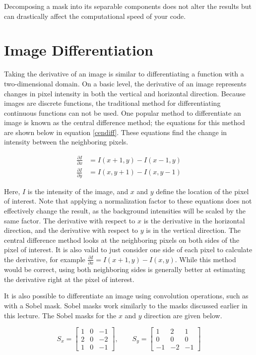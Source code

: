 \documentclass[twoside]{article}
\begin{document}
Decomposing a mask into its separable components does not alter the results but can drastically affect the computational speed of your code.

\section{Image Differentiation}
Taking the derivative of an image is similar to differentiating a function with a two-dimensional domain. On a basic level, the derivative of an image represents changes in pixel intensity in both the vertical and horizontal direction. Because images are discrete functions, the traditional method for differentiating continuous functions can not be used. One popular method to differentiate an image is known as the central difference method; the equations for this method are shown below in equation \ref{cendiff}. These equations find the change in intensity between the neighboring pixels.

\begin{equation}
  \label{cendiff}
  \begin{aligned}
    \frac{\partial I} {\partial x} &= I(x+1,y) - I(x-1,y)\\
    \frac{\partial I} {\partial y} &= I(x,y+1) - I(x,y-1)
  \end{aligned}
\end{equation}

Here, $I$ is the intensity of the image, and $x$ and $y$ define the location of the pixel of interest. Note that applying a normalization factor to these equations does not effectively change the result, as the background intensities will be scaled by the same factor. The derivative with respect to $x$ is the derivative in the horizontal direction, and the derivative with respect to $y$ is in the vertical direction. The central difference method looks at the neighboring pixels on both sides of the pixel of interest. It is also valid to just consider one side of each pixel to calculate the derivative, for example $\frac{\partial I}{\partial x} = I(x+1,y) - I(x,y)$. While this method would be correct, using both neighboring sides is generally better at estimating the derivative right at the pixel of interest.

It is also possible to differentiate an image using convolution operations, such as with a Sobel mask.  Sobel masks work similarly to the masks discussed earlier in this lecture. The Sobel masks for the $x$ and $y$ direction are given below.

\[
S_x =
\begin{bmatrix}
1 & 0 & -1\\
2 & 0 & -2\\
1 & 0 & -1
\end{bmatrix}
, \qquad S_y =
\begin{bmatrix}
1 & 2 & 1\\
0 & 0 & 0\\
-1 & -2 & -1
\end{bmatrix}
\]
\end{document}
